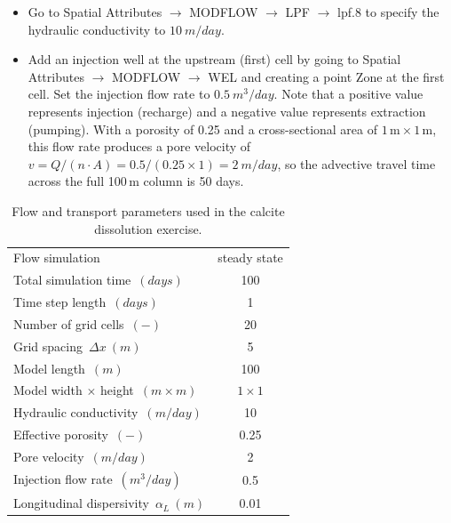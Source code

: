 \begin{itemize}
\item Go to {\color{blue}Spatial Attributes} $\rightarrow$
{\color{blue}MODFLOW} $\rightarrow$
{\color{blue}LPF} $\rightarrow$
{\color{blue}lpf.8}
to specify the hydraulic conductivity to $10\ m/day$.

\item Add an injection well at the upstream (first) cell by going to
{\color{blue}Spatial Attributes} $\rightarrow$
{\color{blue}MODFLOW} $\rightarrow$
{\color{blue}WEL}
and creating a point Zone at the first cell.
Set the injection flow rate to $0.5\ m^3/day$.
Note that a positive value represents injection (recharge) and a
negative value represents extraction (pumping).
With a porosity of 0.25 and a cross-sectional area of
$1\,\mathrm{m} \times 1\,\mathrm{m}$, this flow rate produces a pore
velocity of $v = Q / (n \cdot A) = 0.5 / (0.25 \times 1) = 2\ m/day$,
so the advective travel time across the full 100\,m column is 50 days.

\end{itemize}

\begin{table}[t]
\caption{Flow and transport parameters used in the calcite dissolution exercise.}
\begin{center}
\begin{tabular}{lc}
\toprule
Flow simulation                                   & steady state \\
Total simulation time\ $(days)$                   & 100          \\
Time step length\ $(days)$                        & 1            \\
Number of grid cells\ $(-)$                       & 20           \\
Grid spacing\ $\Delta x\ (m)$                     & 5            \\
Model length\ $(m)$                               & 100          \\
Model width $\times$ height\ $(m \times m)$       & $1 \times 1$ \\
Hydraulic conductivity\ $(m/day)$                 & 10           \\
Effective porosity\ $(-)$                         & 0.25         \\
Pore velocity\ $(m/day)$                          & 2            \\
Injection flow rate\ $(m^3/day)$                  & 0.5          \\
Longitudinal dispersivity\ $\alpha_L\ (m)$        & 0.01         \\
\bottomrule
\end{tabular}
\label{calcite_flow}
\end{center}
\end{table}

